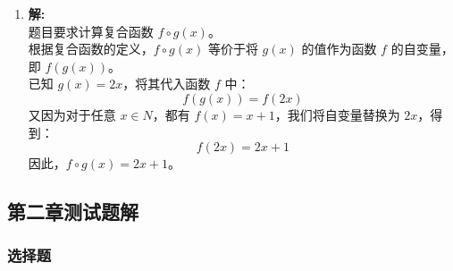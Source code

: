 \begin{enumerate}
	\textbf{寻找 $\alpha$ 的逆元：}\\
	已知幺元为 $\beta$，若 $\alpha$ 的逆元为 $x$，则需要满足 $\alpha * x = x * \alpha = \beta$。\\
	查表可知，在 $\alpha$ 所在的行中，$\alpha * \gamma = \beta$；在 $\alpha$ 所在的列中，$\gamma * \alpha = \beta$。\\
	满足条件的元素是 $\gamma$，因此，\textbf{$\alpha$ 的逆元是 $\gamma$}。
	
	\vspace{1em}
	
	\item \textbf{解:}\\
	题目要求计算复合函数 $f \circ g(x)$。\\
	根据复合函数的定义，$f \circ g(x)$ 等价于将 $g(x)$ 的值作为函数 $f$ 的自变量，即 $f(g(x))$。\\
	已知 $g(x) = 2x$，将其代入函数 $f$ 中：
	\[ f(g(x)) = f(2x) \]
	又因为对于任意 $x \in N$，都有 $f(x) = x + 1$，我们将自变量替换为 $2x$，得到：
	\[ f(2x) = 2x + 1 \]
	因此，$f \circ g(x) = 2x + 1$。
\end{enumerate}
\newpage

\subsection{第二章测试题解}

\subsubsection{选择题}

